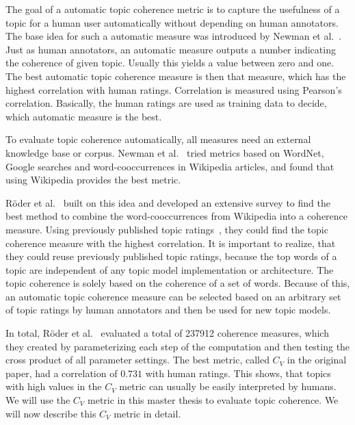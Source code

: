 \documentclass[
        a4paper,
        titlepage,
        twoside,
        parskip
        ]{scrbook}
\theoremstyle{break}
\begin{document}
The goal of a automatic topic coherence metric is to capture the usefulness of a topic for a human user automatically without depending on human annotators.
The base idea for such a automatic measure was introduced by Newman et al.~\cite{Newman2010}.
Just as human annotators, an automatic measure outputs a number indicating the coherence of given topic.
Usually this yields a value between zero and one.
The best automatic topic coherence measure is then that measure, which has the highest correlation with human ratings.
Correlation is measured using Pearson's correlation.
Basically, the human ratings are used as training data to decide, which automatic measure is the best.

To evaluate topic coherence automatically, all measures need an external knowledge base or corpus.
Newman et al.~\cite{Newman2010} tried metrics based on WordNet, Google searches and word-cooccurrences in Wikipedia articles, and found that using Wikipedia provides the best metric.

Röder et al.~\cite{Roder2015} built on this idea and developed an extensive survey to find the best method to combine the word-cooccurrences from Wikipedia into a coherence measure.
Using previously published topic ratings~\cite{Aletras2013,Chang2009,Newman2010,Rosner2013}, they could find the topic coherence measure with the highest correlation.
It is important to realize, that they could reuse previously published topic ratings, because the top words of a topic are independent of any topic model implementation or architecture.
The topic coherence is solely based on the coherence of a set of words.
Because of this, an automatic topic coherence measure can be selected based on an arbitrary set of topic ratings by human annotators and then be used for new topic models.

In total, Röder et al.~\cite{Roder2015} evaluated a total of 237912 coherence measures, which they created by parameterizing each step of the computation and then testing the cross product of all parameter settings.
The best metric, called $C_V$ in the original paper, had a correlation of $0.731$ with human ratings.
This shows, that topics with high values in the $C_V$ metric can usually be easily interpreted by humans.
We will use the $C_V$ metric in this master thesis to evaluate topic coherence.
We will now describe this $C_V$ metric in detail.
\end{document}
